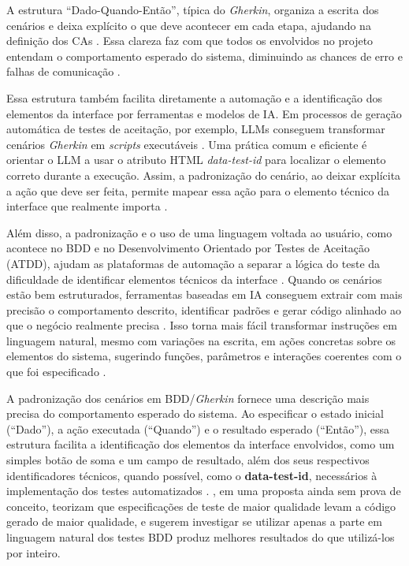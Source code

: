 A estrutura “Dado-Quando-Então”, típica do \textit{Gherkin}, organiza a escrita dos cenários e deixa explícito o que deve acontecer em cada etapa, ajudando na definição dos CAs \cite{Alinezhadtilaki2025, Babikian2025}. Essa clareza faz com que todos os envolvidos no projeto entendam o comportamento esperado do sistema, diminuindo as chances de erro e falhas de comunicação \cite{Alinezhadtilaki2025}.

Essa estrutura também facilita diretamente a automação e a identificação dos elementos da interface por ferramentas e modelos de IA. Em processos de geração automática de testes de aceitação, por exemplo, LLMs conseguem transformar cenários \textit{Gherkin} em \textit{scripts} executáveis \cite{Paduraru2025, Ferreira2025}. Uma prática comum e eficiente é orientar o LLM a usar o atributo HTML \textit{data-test-id} para localizar o elemento correto durante a execução. Assim, a padronização do cenário, ao deixar explícita a ação que deve ser feita, permite mapear essa ação para o elemento técnico da interface que realmente importa \cite{Ferreira2025}.

Além disso, a padronização e o uso de uma linguagem voltada ao usuário, como acontece no BDD e no Desenvolvimento Orientado por Testes de Aceitação (ATDD), ajudam as plataformas de automação a separar a lógica do teste da dificuldade de identificar elementos técnicos da interface \cite{Penagos2024}. Quando os cenários estão bem estruturados, ferramentas baseadas em IA conseguem extrair com mais precisão o comportamento descrito, identificar padrões e gerar código alinhado ao que o negócio realmente precisa \cite{Zhang2025}. Isso torna mais fácil transformar instruções em linguagem natural, mesmo com variações na escrita, em ações concretas sobre os elementos do sistema, sugerindo funções, parâmetros e interações coerentes com o que foi especificado \cite{Paduraru2025}.

A padronização dos cenários em BDD/\textit{Gherkin} fornece uma descrição mais precisa do comportamento esperado do sistema. Ao especificar o estado inicial (“Dado”), a ação executada (“Quando”) e o resultado esperado (“Então”), essa estrutura facilita a identificação dos elementos da interface envolvidos, como um simples botão de soma e um campo de resultado, além dos seus respectivos identificadores técnicos, quando possível, como o \textbf{data-test-id}, necessários à implementação dos testes automatizados \cite{Ferreira2025}. , em uma proposta ainda sem prova de conceito, teorizam que especificações de teste de maior qualidade levam a código gerado de maior qualidade, e sugerem investigar se utilizar apenas a parte em linguagem natural dos testes BDD produz melhores resultados do que utilizá-los por inteiro.

